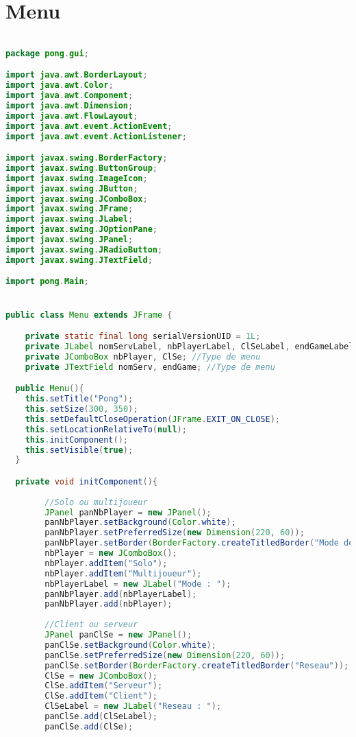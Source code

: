 \section{Menu}
\begin{lstlisting}[language=Java]

package pong.gui;

import java.awt.BorderLayout;
import java.awt.Color;
import java.awt.Component;
import java.awt.Dimension;
import java.awt.FlowLayout;
import java.awt.event.ActionEvent;
import java.awt.event.ActionListener;

import javax.swing.BorderFactory;
import javax.swing.ButtonGroup;
import javax.swing.ImageIcon;
import javax.swing.JButton;
import javax.swing.JComboBox;
import javax.swing.JFrame;
import javax.swing.JLabel;
import javax.swing.JOptionPane;
import javax.swing.JPanel;
import javax.swing.JRadioButton;
import javax.swing.JTextField;

import pong.Main;


public class Menu extends JFrame {

	private static final long serialVersionUID = 1L;
	private JLabel nomServLabel, nbPlayerLabel, ClSeLabel, endGameLabel; //Les differents menu
	private JComboBox nbPlayer, ClSe; //Type de menu
	private JTextField nomServ, endGame; //Type de menu

  public Menu(){
    this.setTitle("Pong");
    this.setSize(300, 350);
    this.setDefaultCloseOperation(JFrame.EXIT_ON_CLOSE);
    this.setLocationRelativeTo(null);      
    this.initComponent();
    this.setVisible(true);
  }

  private void initComponent(){
	  
	  	//Solo ou multijoueur
	    JPanel panNbPlayer = new JPanel();
	    panNbPlayer.setBackground(Color.white);
	    panNbPlayer.setPreferredSize(new Dimension(220, 60));
	    panNbPlayer.setBorder(BorderFactory.createTitledBorder("Mode de jeu"));
	    nbPlayer = new JComboBox();
	    nbPlayer.addItem("Solo");
	    nbPlayer.addItem("Multijoueur");
	    nbPlayerLabel = new JLabel("Mode : ");
	    panNbPlayer.add(nbPlayerLabel);
	    panNbPlayer.add(nbPlayer);
	    
	    //Client ou serveur
	    JPanel panClSe = new JPanel();
	    panClSe.setBackground(Color.white);
	    panClSe.setPreferredSize(new Dimension(220, 60));
	    panClSe.setBorder(BorderFactory.createTitledBorder("Reseau"));
	    ClSe = new JComboBox();
	    ClSe.addItem("Serveur");
	    ClSe.addItem("Client");
	    ClSeLabel = new JLabel("Reseau : ");
	    panClSe.add(ClSeLabel);
	    panClSe.add(ClSe);


\end{lstlisting}
